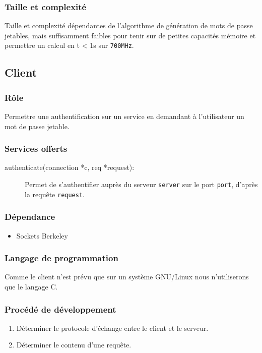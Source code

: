 \documentclass{"../../res/univ-projet"}
\begin{document}
    \subsubsection{Taille et complexité}
            Taille et complexité dépendantes de l'algorithme de génération
        de mots de passe jetables, mais suffisamment faibles pour tenir sur
        de petites capacités mémoire et permettre un calcul 
        en t < 1s sur \verb?700MHz?.

\subsection{Client}
    \subsubsection{Rôle}
        Permettre une authentification sur un service en demandant à
    l'utilisateur un mot de passe jetable.

    \subsubsection{Services offerts}
    \begin{description}
        \item[authenticate(connection *c, req *request):] Permet
            de s'authentifier auprès du serveur \verb?server? sur 
            le port \verb?port?, d'après la requête \verb?request?.
    \end{description}

    \subsubsection{Dépendance}
    \begin{itemize}
        \item Sockets Berkeley
    \end{itemize}

    \subsubsection{Langage de programmation}
        Comme le client n'est prévu que sur un système GNU/Linux nous n'utiliserons
    que le langage C.

    \subsubsection{Procédé de développement}
    \begin{enumerate}
        \item Déterminer le protocole d'échange entre le client et le
            serveur.
        \item Déterminer le contenu d'une requête.
    \end{enumerate}
\end{document}
